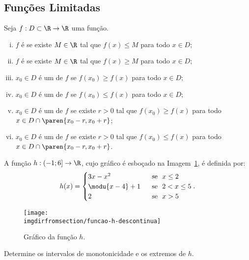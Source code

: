 \subsection{Funções Limitadas}

\begin{definition}
    Seja $f: D \subset \R \to \R$ uma função.
\begin{enumerate}[(i)]
  \item $f$ é  se existe $M \in \R$ tal
  que $f(x) \leq M$ para todo $x \in D$;
  \item $f$ é  se existe $M \in \R$ tal
  que $f(x) \geq M$ para todo $x \in D$;
  \item $x_0 \in D$ é um  de $f$ se
  $f(x_0) \geq f(x)$ para todo $x \in D$;
  \item $x_0 \in D$ é um  de $f$ se
  $f(x_0) \leq f(x)$ para todo $x \in D$;
  \item $x_0 \in D$ é um  de $f$ se
  existe $r>0$ tal que $f(x_0) \geq f(x)$ para todo $x \in D \cap \paren{x_0 - r , x_0+r}$;
  \item $x_0 \in D$ é um  de $f$ se
  existe $r>0$ tal que $f(x_0) \leq f(x)$ para todo $x \in D \cap \paren{x_0 - r ,
  x_0+r}$.
\end{enumerate}
\end{definition}

\begin{example}
    A função $h : \left( -1 ; 6 \right] \to \R$, cujo gráfico é esboçado
na Imagem~\ref{img:funcao-h-descontinua}, é definida por:
%
$$h(x) = \begin{cases}
                                3x-x^2 & \ \text{ se } \ x\leq 2 \\
                                \modu{x-4} +1 & \ \text{ se } \ 2 < x \leq 5 \\
                                2 & \ \text{ se } \ x > 5 \\
                                \end{cases}.$$
%
\begin{figure}
\centering
\texttt{[image: \\imgdirfromsection/funcao-h-descontinua]}
\caption{Gráfico da função $h$.}
\label{img:funcao-h-descontinua}
\end{figure}

Determine os intervalos de monotonicidade e os extremos de $h$.
\end{example}


